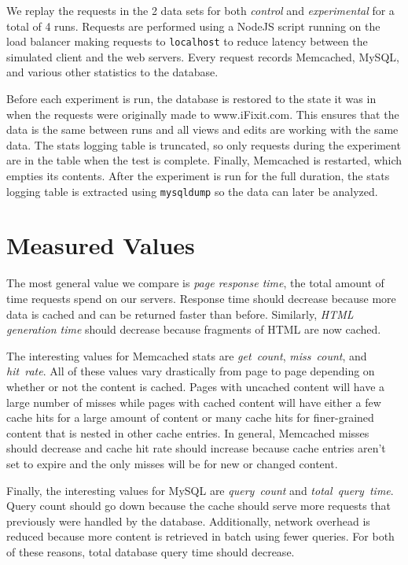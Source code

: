 \documentclass[12pt]{ucthesis}
\begin{document}
We replay the requests in the 2 data sets for both \textit{control} and \textit{experimental} for a total of 4 runs.
Requests are performed using a NodeJS script running on the load balancer making requests to {\tt localhost} to reduce latency between the simulated client and the web servers.
Every request records \textsf{Memcached}, \textsf{MySQL}, and various other statistics to the database.

Before each experiment is run, the database is restored to the state it was in when the requests were originally made to \textsf{www.iFixit.com}.
This ensures that the data is the same between runs and all views and edits are working with the same data.
The stats logging table is truncated, so only requests during the experiment are in the table when the test is complete.
Finally, \textsf{Memcached} is restarted, which empties its contents.
After the experiment is run for the full duration, the stats logging table is extracted using {\tt mysqldump} so the data can later be analyzed.

\section{Measured Values}
The most general value we compare is \textit{page response time}, the total amount of time requests spend on our servers.
Response time should decrease because more data is cached and can be returned faster than before.
Similarly, \textit{HTML generation time} should decrease because fragments of HTML are now cached.

The interesting values for \textsf{Memcached} stats are \textit{get~count}, \textit{miss~count}, and \textit{hit~rate}.
All of these values vary drastically from page to page depending on whether or not the content is cached.
Pages with uncached content will have a large number of misses while pages with cached content will have either a few cache hits for a large amount of content or many cache hits for finer-grained content that is nested in other cache entries.
In general, \textsf{Memcached} misses should decrease and cache hit rate should increase because cache entries aren't set to expire and the only misses will be for new or changed content.

Finally, the interesting values for \textsf{MySQL} are \textit{query~count} and \textit{total~query~time}.
Query count should go down because the cache should serve more requests that previously were handled by the database.
Additionally, network overhead is reduced because more content is retrieved in batch using fewer queries.
For both of these reasons, total database query time should decrease.
\end{document}
